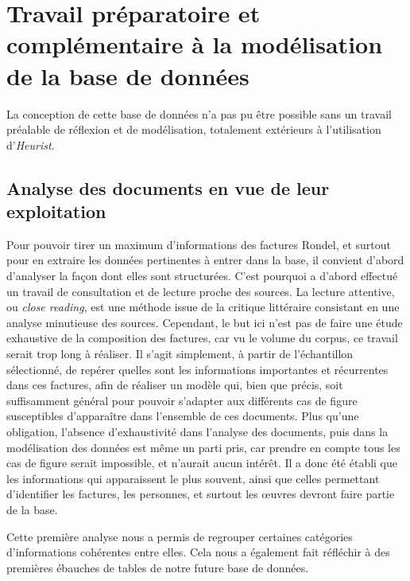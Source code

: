 \chapter{Travail préparatoire et complémentaire à la modélisation de la base de données}

La conception de cette base de données n'a pas pu être possible sans un travail préalable de réflexion et de modélisation, totalement extérieurs à l'utilisation d'\emph{Heurist}. 

\section{Analyse des documents en vue de leur exploitation}

Pour pouvoir tirer un maximum d'informations des factures Rondel, et surtout pour en extraire les données pertinentes à entrer dans la base, il convient d'abord d'analyser la façon dont elles sont structurées. C'est pourquoi a d'abord effectué un travail de consultation et de lecture proche des sources. La lecture attentive, ou \emph{close reading}, est une méthode issue de la critique littéraire consistant en une analyse minutieuse des sources. 
Cependant, le but ici n'est pas de faire une étude exhaustive de la composition des factures, car vu le volume du corpus, ce travail serait trop long à réaliser. Il s'agit simplement, à partir de l'échantillon sélectionné, de repérer quelles sont les informations importantes et récurrentes dans ces factures, afin de réaliser un modèle qui, bien que précis, soit suffisamment général pour pouvoir s'adapter aux différents cas de figure susceptibles d'apparaître dans l'ensemble de ces documents. Plus qu'une obligation, l'absence d'exhaustivité dans l'analyse des documents, puis dans la modélisation des données est même un parti pris, car prendre en compte tous les cas de figure serait impossible, et n'aurait aucun intérêt. Il a donc été établi que les informations qui apparaissent le plus souvent, ainsi que celles permettant d'identifier les factures, les personnes, et surtout les œuvres devront faire partie de la base.

Cette première analyse nous a permis de regrouper certaines catégories d'informations cohérentes entre elles. Cela nous a également fait réfléchir à des premières ébauches de tables de notre future base de données.

